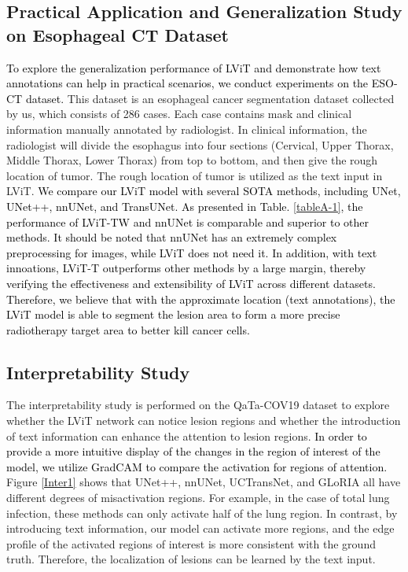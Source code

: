 \documentclass[lettersize,journal]{IEEEtran}
\begin{document}
\subsection{Practical Application and Generalization Study on Esophageal CT Dataset}
\textcolor{black}{
To explore the generalization performance of LViT and demonstrate how text annotations can help in practical scenarios, we conduct experiments on the ESO-CT dataset.} This dataset is an esophageal cancer segmentation dataset collected by us, which consists of 286 cases. Each case contains mask and clinical information manually annotated by radiologist. In clinical information, the radiologist will divide the esophagus into four sections (Cervical, Upper Thorax, Middle Thorax, Lower Thorax) from top to bottom, and then give the rough location of tumor. The rough location of tumor is utilized as the text input in LViT. 
\textcolor{black}{
We compare our LViT model with several SOTA methods, including UNet, UNet++, nnUNet, and TransUNet.
As presented in Table. \ref{tableA-1}, the performance of LViT-TW and nnUNet is comparable and superior to other methods. It should be noted that nnUNet has an extremely complex preprocessing for images, while LViT does not need it. In addition, with text innoations, LViT-T outperforms other methods by a large margin,  thereby verifying the effectiveness and extensibility of LViT across different datasets.}
\textcolor{black}{
Therefore, we believe that with the approximate location (text annotations), the LViT model is able to segment the lesion area to form a more precise radiotherapy target area to better kill cancer cells.}


\subsection{Interpretability Study}
\label{sectionIS}
The interpretability study is performed on the QaTa-COV19 dataset to explore whether the LViT network can notice lesion regions and whether the introduction of text information can enhance the attention to lesion regions. 
\textcolor{black}{
In order to provide a more intuitive display of the changes in the region of interest of the model, we utilize GradCAM \cite{selvaraju2017grad} to compare the activation for regions of attention.}
Figure \ref{Inter1} shows that UNet++, nnUNet, UCTransNet, and GLoRIA all have different degrees of misactivation regions. For example, in the case of total lung infection, these methods can only activate half of the lung region. In contrast, by introducing text information, our model can activate more regions, and the edge profile of the activated regions of interest is more consistent with the ground truth. Therefore, the localization of lesions can be learned by the text input. 
\end{document}
